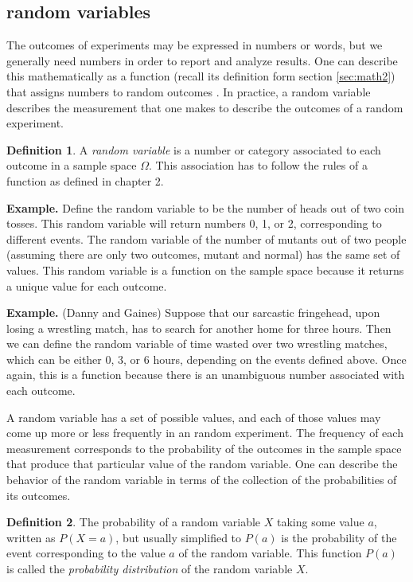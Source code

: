 \documentclass[
]{book}
\theoremstyle{definition}
\newtheorem{definition}{Definition}[chapter]
\theoremstyle{definition}
\theoremstyle{definition}
\theoremstyle{remark}
\begin{document}
\hypertarget{random-variables}{%
\subsection{random variables}\label{random-variables}}

The outcomes of experiments may be expressed in numbers or words, but we generally need numbers in order to report and analyze results. One can describe this mathematically as a function (recall its definition form section \ref{sec:math2}) that assigns numbers to random outcomes \citep{feller_introduction_????}. In practice, a random variable describes the measurement that one makes to describe the outcomes of a random experiment.

\begin{definition}
\protect\hypertarget{def:def-rand-var}{}{\label{def:def-rand-var} }A \emph{random variable} is a number or category associated to each outcome in a sample space \(\Omega\). This association has to follow the rules of a function as defined in chapter 2.
\end{definition}

\textbf{Example.} Define the random variable to be the number of heads out of two coin tosses. This random variable will return numbers 0, 1, or 2, corresponding to different events. The random variable of the number of mutants out of two people (assuming there are only two outcomes, mutant and normal) has the same set of values. This random variable is a function on the sample space because it returns a unique value for each outcome.

\textbf{Example.} (Danny and Gaines) Suppose that our sarcastic fringehead, upon losing a wrestling match, has to search for another home for three hours. Then we can define the random variable of time wasted over two wrestling matches, which can be either 0, 3, or 6 hours, depending on the events defined above. Once again, this is a function because there is an unambiguous number associated with each outcome.

A random variable has a set of possible values, and each of those values may come up more or less frequently in an random experiment. The frequency of each measurement corresponds to the probability of the outcomes in the sample space that produce that particular value of the random variable. One can describe the behavior of the random variable in terms of the collection of the probabilities of its outcomes.

\begin{definition}
\protect\hypertarget{def:def-prb-dist}{}{\label{def:def-prb-dist} }The probability of a random variable \(X\) taking some value \(a\), written as \(P(X=a)\), but usually simplified to \(P(a)\) is the probability of the event corresponding to the value \(a\) of the random variable. This function \(P(a)\) is called the \emph{probability distribution} of the random variable \(X\).
\end{definition}
\end{document}
